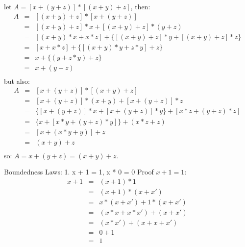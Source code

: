 \documentclass{article}
\begin{document}
let $A = [x + (y + z)] * [(x + y) + z]$, then:
\begin{eqnarray*}
A & = & [(x + y) + z] * [x + (y + z)] \\
  & = & [(x + y) + z] * x + [(x + y) + z] * (y + z) \\
  & = & [(x + y) * x + x * z] + \{[(x + y) + z] * y + [(x + y) + z] * z\} \\
  & = & [x + x * z] + \{[(x + y) * y + z * y] + z\} \\
  & = & x + \{(y + z * y) + z\} \\
  & = & x + (y + z) \\
\end{eqnarray*}
but also:
\begin{eqnarray*}
A & = & [x + (y + z)] * [(x + y) + z] \\
  & = & [x + (y + z)] * (x + y) + [x + (y + z)] * z \\
  & = & \{[x + (y + z)] * x + [x + (y + z)] * y\} + [x * z + (y + z) * z]\\
  & = & \{x + [x * y + (y + z) * y]\} + (x * z + z)\\
  & = & [x + (x * y + y)] + z\\
  & = & (x + y) + z \\
\end{eqnarray*}
so: $A = x + (y + z) = (x + y) + z$.

Boundedness Laws: 1. x + 1 = 1, x * 0 = 0
Proof $x + 1 = 1$:
\begin{eqnarray*}
x + 1 & = & (x + 1) * 1 \\
      & = & (x + 1) * (x + x') \\
      & = & x * (x + x') + 1 * (x + x') \\
      & = & (x * x + x * x') + (x + x') \\
      & = & (x * x') + (x + x + x') \\
      & = & 0 + 1 \\
      & = & 1 \\
\end{eqnarray*}
\end{document}
